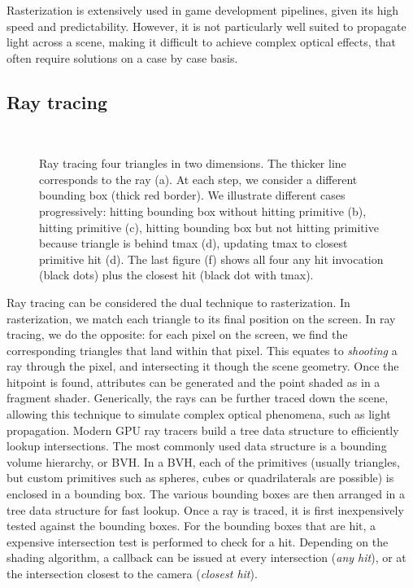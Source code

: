 Rasterization is extensively used in game development pipelines, given its high speed and predictability. However, it is not particularly well suited to propagate light across a scene, making it difficult to achieve complex optical effects, that often require solutions on a case by case basis.

\subsection{Ray tracing}

\begin{figure}
\centering
   \def\svgwidth{\textwidth}
    \\
\caption{Ray tracing four triangles in two dimensions. The thicker line corresponds to the ray (a). At each step, we consider a different bounding box (thick red border). We illustrate different cases progressively: hitting bounding box without hitting primitive (b), hitting primitive (c), hitting bounding box but not hitting primitive because triangle is behind tmax (d), updating tmax to closest primitive hit (d). The last figure (f) shows all four any hit invocation (black dots) plus the closest hit (black dot with tmax).} 
\label{fig:ray_tracing}
\end{figure}

Ray tracing can be considered the dual technique to rasterization. In rasterization, we match each triangle to its final position on the screen. In ray tracing, we do the opposite: for each pixel on the screen, we find the corresponding triangles that land within that pixel. This equates to \emph{shooting} a ray through the pixel, and intersecting it though the scene geometry. Once the hitpoint is found, attributes can be generated and the point shaded as in a fragment shader. Generically, the rays can be further traced down the scene, allowing this technique to simulate complex optical phenomena, such as light propagation. 
Modern GPU ray tracers build a tree data structure to efficiently lookup intersections. The most commonly used data structure is a bounding volume hierarchy, or BVH. In a BVH, each of the primitives (usually triangles, but custom primitives such as spheres, cubes or quadrilaterals are possible) is enclosed in a bounding box. The various bounding boxes are then arranged in a tree data structure for fast lookup. Once a ray is traced, it is first inexpensively tested against the bounding boxes. For the bounding boxes that are hit, a expensive intersection test is performed to check for a hit. Depending on the shading algorithm, a callback can be issued at every intersection (\emph{any hit}), or at the intersection closest to the camera (\emph{closest hit}). 

